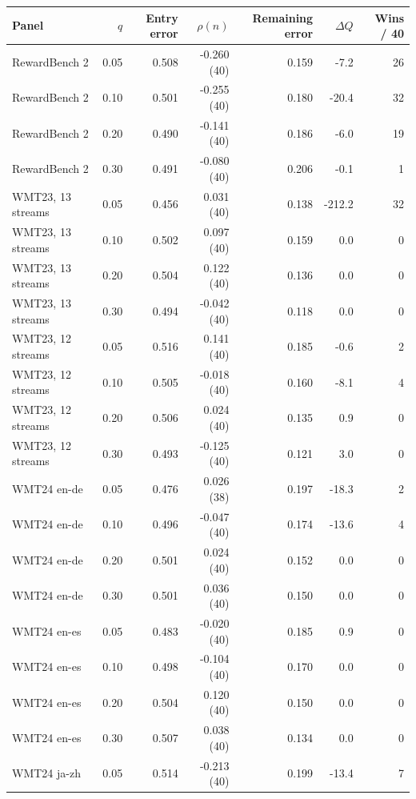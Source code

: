 \begin{table}[t]
\centering\small


\begin{tabular}{lrrrrrr}
\toprule
Panel & $q$ & Entry error & $\rho(n)$ & Remaining error & $\Delta Q$ & Wins / 40 \\
\midrule
RewardBench 2 & 0.05 & 0.508 & -0.260 (40) & 0.159 & -7.2 & 26 \\
RewardBench 2 & 0.10 & 0.501 & -0.255 (40) & 0.180 & -20.4 & 32 \\
RewardBench 2 & 0.20 & 0.490 & -0.141 (40) & 0.186 & -6.0 & 19 \\
RewardBench 2 & 0.30 & 0.491 & -0.080 (40) & 0.206 & -0.1 & 1 \\
\addlinespace
WMT23, 13 streams & 0.05 & 0.456 & 0.031 (40) & 0.138 & -212.2 & 32 \\
WMT23, 13 streams & 0.10 & 0.502 & 0.097 (40) & 0.159 & 0.0 & 0 \\
WMT23, 13 streams & 0.20 & 0.504 & 0.122 (40) & 0.136 & 0.0 & 0 \\
WMT23, 13 streams & 0.30 & 0.494 & -0.042 (40) & 0.118 & 0.0 & 0 \\
\addlinespace
WMT23, 12 streams & 0.05 & 0.516 & 0.141 (40) & 0.185 & -0.6 & 2 \\
WMT23, 12 streams & 0.10 & 0.505 & -0.018 (40) & 0.160 & -8.1 & 4 \\
WMT23, 12 streams & 0.20 & 0.506 & 0.024 (40) & 0.135 & 0.9 & 0 \\
WMT23, 12 streams & 0.30 & 0.493 & -0.125 (40) & 0.121 & 3.0 & 0 \\
\addlinespace
WMT24 en-de & 0.05 & 0.476 & 0.026 (38) & 0.197 & -18.3 & 2 \\
WMT24 en-de & 0.10 & 0.496 & -0.047 (40) & 0.174 & -13.6 & 4 \\
WMT24 en-de & 0.20 & 0.501 & 0.024 (40) & 0.152 & 0.0 & 0 \\
WMT24 en-de & 0.30 & 0.501 & 0.036 (40) & 0.150 & 0.0 & 0 \\
\addlinespace
WMT24 en-es & 0.05 & 0.483 & -0.020 (40) & 0.185 & 0.9 & 0 \\
WMT24 en-es & 0.10 & 0.498 & -0.104 (40) & 0.170 & 0.0 & 0 \\
WMT24 en-es & 0.20 & 0.504 & 0.120 (40) & 0.150 & 0.0 & 0 \\
WMT24 en-es & 0.30 & 0.507 & 0.038 (40) & 0.134 & 0.0 & 0 \\
\addlinespace
WMT24 ja-zh & 0.05 & 0.514 & -0.213 (40) & 0.199 & -13.4 & 7 \\

\end{tabular}
\end{table}
